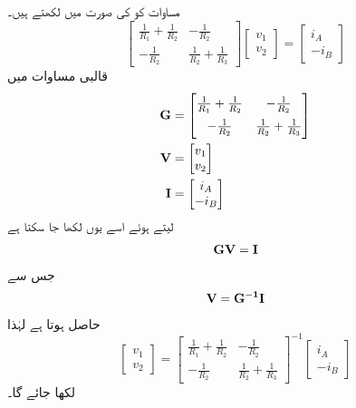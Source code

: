 مساوات  کو  کی صورت میں لکھتے ہیں۔
\begin{equation}\label{مساوات_جوڑ_دو_جوڑ_تشاکل_الف}
\begin{bmatrix}
\frac{1}{R_1}+\frac{1}{R_2} & - \frac{1}{R_2}\\[6pt]
-\frac{1}{R_2}& \frac{1}{R_2}+\frac{1}{R_3}
\end{bmatrix}
\begin{bmatrix}
v_1 \\[6pt]
v_2
\end{bmatrix}
=
\begin{bmatrix}
i_A\\[6pt]
-i_B
\end{bmatrix}
\end{equation}
قالبی مساوات میں
\begin{align*}
{\bf{G}}&=
\begin{bmatrix}
\frac{1}{R_1}+\frac{1}{R_2} & - \frac{1}{R_2}\\[6pt]
-\frac{1}{R_2}& \frac{1}{R_2}+\frac{1}{R_3}
\end{bmatrix}\\
{\bf{V}}&=
\begin{bmatrix}
v_1 \\
v_2
\end{bmatrix}\\
{\bf{I}}&=\begin{bmatrix}
i_A\\
-i_B
\end{bmatrix}
\end{align*}
لیتے ہوئے اسے یوں لکھا جا سکتا ہے
\begin{align*}
{\bf{G V=I}}
\end{align*}
جس سے
\begin{align*}
{\bf{V=G^{-1}I}}
\end{align*}
حاصل ہوتا ہے لہٰذا
\begin{equation}\label{مساوات_جوڑ_قالبی_حل_دو_جوڑ}
\begin{bmatrix}
v_1 \\[6pt]
v_2
\end{bmatrix}
=
\begin{bmatrix}
\frac{1}{R_1}+\frac{1}{R_2} & - \frac{1}{R_2}\\[6pt]
-\frac{1}{R_2}& \frac{1}{R_2}+\frac{1}{R_3}
\end{bmatrix}^{-1}
\begin{bmatrix}
i_A\\[6pt]
-i_B
\end{bmatrix}
\end{equation}
لکھا جائے گا۔

